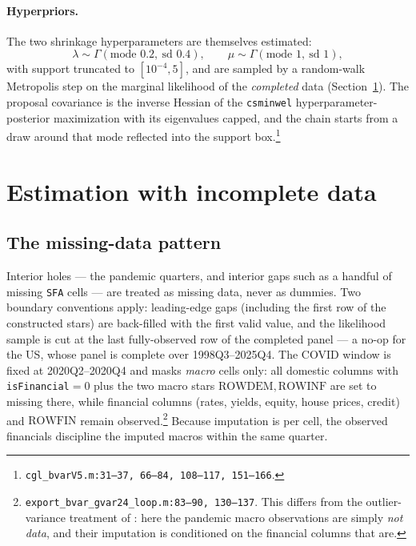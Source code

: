 \documentclass[11pt]{article}
\newcommand{\code}[1]{\texttt{\small #1}}
\begin{document}
\paragraph{Hyperpriors.} The two shrinkage hyperparameters are themselves estimated:
\begin{equation}\label{eq:hyper}
  \lambda \sim \Gamma(\text{mode } 0.2,\ \text{sd } 0.4), \qquad
  \mu \sim \Gamma(\text{mode } 1,\ \text{sd } 1),
\end{equation}
with support truncated to $[10^{-4}, 5]$, and are sampled by a random-walk Metropolis step on the
marginal likelihood of the \emph{completed} data (Section~\ref{sec:estimation}). The proposal
covariance is the inverse Hessian of the \code{csminwel} hyperparameter-posterior maximization
with its eigenvalues capped, and the chain starts from a draw around that mode reflected into the
support box.\footnote{\code{cgl\_bvarV5.m:31--37, 66--84, 108--117, 151--166}.}

\section{Estimation with incomplete data}\label{sec:estimation}

\subsection{The missing-data pattern}

Interior holes --- the pandemic quarters, and interior gaps such as a handful of missing
\code{SFA} cells --- are treated as missing data, never as dummies. Two boundary conventions
apply: leading-edge gaps (including the first row of the constructed stars) are back-filled with
the first valid value, and the likelihood sample is cut at the last fully-observed row of the
completed panel --- a no-op for the US, whose panel is complete over 1998Q3--2025Q4.
The COVID window is fixed at 2020Q2--2020Q4 and
masks \emph{macro} cells only: all domestic columns with \code{isFinancial}${}=0$ plus the two
macro stars $\mathrm{ROWDEM}, \mathrm{ROWINF}$ are set to missing there, while financial columns
(rates, yields, equity, house prices, credit) and $\mathrm{ROWFIN}$ remain
observed.\footnote{\code{export\_bvar\_gvar24\_loop.m:83--90, 130--137}. This differs from the
outlier-variance treatment of \citet{LenzaPrimiceri2022}: here the pandemic macro observations
are simply \emph{not data}, and their imputation is conditioned on the financial columns that
are.} Because imputation is per cell, the observed financials discipline the imputed macros
within the same quarter.
\end{document}
